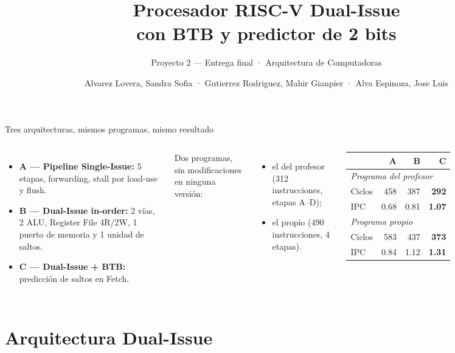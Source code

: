 \documentclass[aspectratio=169,10pt]{beamer}
\title{Procesador RISC-V Dual-Issue\\ con BTB y predictor de 2 bits}
\subtitle{Proyecto 2 — Entrega final · Arquitectura de Computadoras}
\author{\small Alvarez Lovera, Sandra Sofia · Gutierrez Rodriguez, Mahir Gianpier · Alva Espinoza, Jose Luis}
\institute{UTEC · 2026 – 2}
\date{}
\begin{document}
\maketitle

\begin{frame}{Tres arquitecturas, mismos programas, mismo resultado}
\begin{columns}[T]
\begin{itemize}
  \item \textbf{A — Pipeline Single-Issue:} 5 etapas, forwarding, stall por load-use y flush.
  \item \textbf{B — Dual-Issue in-order:} 2 vías, 2 ALU, Register File 4R/2W, 1 puerto de memoria y 1 unidad de saltos.
  \item \textbf{C — Dual-Issue + BTB:} predicción de saltos en Fetch.
\end{itemize}
\vspace{4pt}
Dos programas, sin modificaciones en ninguna versión:
\begin{itemize}
  \item el del profesor (312 instrucciones, etapas A–D);
  \item el propio (490 instrucciones, 4 etapas).
\end{itemize}
\small
\begin{tabular}{lrrr}
\toprule
 & A & B & C \\
\midrule
\multicolumn{4}{l}{\textit{Programa del profesor}} \\
Ciclos & 458 & 387 & \alert{\textbf{292}} \\
IPC & 0.68 & 0.81 & \alert{\textbf{1.07}} \\
\midrule
\multicolumn{4}{l}{\textit{Programa propio}} \\
Ciclos & 583 & 437 & \alert{\textbf{373}} \\
IPC & 0.84 & 1.12 & \alert{\textbf{1.31}} \\
\bottomrule
\end{tabular}
\end{columns}
\end{frame}

\section{Arquitectura Dual-Issue}
\end{document}
